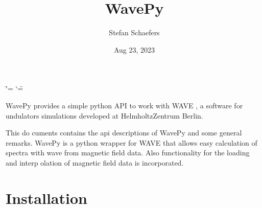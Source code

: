 \documentclass[letterpaper,10pt,english]{sphinxmanual}
\title{WavePy}
\date{Aug 23, 2023}
\author{Stefan Schaefers}
\begin{document}
\ifdefined\shorthandoff
  \ifnum\catcode`\=\string=\active\shorthandoff{=}\fi
  \ifnum\catcode`\"=\active{}\fi
\fi

\pagestyle{empty}
\sphinxmaketitle
\pagestyle{plain}
\sphinxtableofcontents
\pagestyle{normal}
\label{\detokenize{index::doc}}


\sphinxAtStartPar
WavePy provides a simple python API to work with WAVE
,
a software for undulators simulations developed at Helmholtz\sphinxhyphen{}Zentrum Berlin.

\sphinxAtStartPar
This do cuments contains the api descriptions of WavePy and some general
remarks.
WavePy is a python wrapper for WAVE that allows easy calculation of
spectra with wave from magnetic field data. Also functionality for the loading
and interp olation of magnetic field data is incorporated.

\sphinxstepscope


\chapter{Installation}
\label{\detokenize{installation:installation}}\label{\detokenize{installation::doc}}
\end{document}

